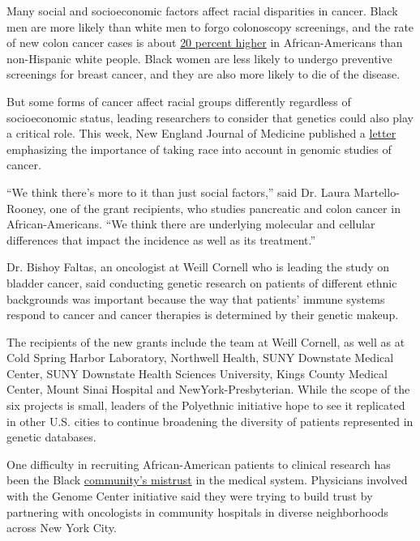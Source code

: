 Many social and socioeconomic factors affect racial disparities in
cancer. Black men are more likely than white men to forgo colonoscopy
screenings, and the rate of new colon cancer cases is about
\href{https://www.nytimes3xbfgragh.onion/2020/08/29/health/colon-cancer-chadwick-boseman.html}{20
percent higher} in African-Americans than non-Hispanic white people.
Black women are less likely to undergo preventive screenings for breast
cancer, and they are also more likely to die of the disease.

But some forms of cancer affect racial groups differently regardless of
socioeconomic status, leading researchers to consider that genetics
could also play a critical role. This week, New England Journal of
Medicine published a
\href{https://www.nejm.org/doi/full/10.1056/NEJMc2000069}{letter}
emphasizing the importance of taking race into account in genomic
studies of cancer.

``We think there's more to it than just social factors,'' said Dr. Laura
Martello-Rooney, one of the grant recipients, who studies pancreatic and
colon cancer in African-Americans. ``We think there are underlying
molecular and cellular differences that impact the incidence as well as
its treatment.''

Dr. Bishoy Faltas, an oncologist at Weill Cornell who is leading the
study on bladder cancer, said conducting genetic research on patients of
different ethnic backgrounds was important because the way that
patients' immune systems respond to cancer and cancer therapies is
determined by their genetic makeup.

The recipients of the new grants include the team at Weill Cornell, as
well as at Cold Spring Harbor Laboratory, Northwell Health, SUNY
Downstate Medical Center, SUNY Downstate Health Sciences University,
Kings County Medical Center, Mount Sinai Hospital and
NewYork-Presbyterian. While the scope of the six projects is small,
leaders of the Polyethnic initiative hope to see it replicated in other
U.S. cities to continue broadening the diversity of patients represented
in genetic databases.

One difficulty in recruiting African-American patients to clinical
research has been the Black
\href{https://www.nytimes3xbfgragh.onion/2020/01/13/upshot/bad-medicine-the-harm-that-comes-from-racism.html}{community's
mistrust} in the medical system. Physicians involved with the Genome
Center initiative said they were trying to build trust by partnering
with oncologists in community hospitals in diverse neighborhoods across
New York City.

